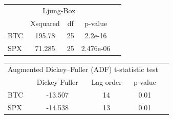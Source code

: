 \documentclass{beamer}
\begin{document}
\begin{frame}
	\begin{center}
		\begin{tabular}{l|*{3}{c}r}
		\multicolumn{4}{c}{Ljung-Box}\\
				& Xsquared & df & p-value \\
		\hline
			BTC & 195.78 & 25 & 2.2e-16 \\  
			SPX & 71.285 & 25 & 2.476e-06  
		\end{tabular}

		\bigskip
		\bigskip
		\begin{tabular}{l|*{3}{c}r}
			\multicolumn{4}{c}{Augmented Dickey–Fuller (ADF) t-statistic test}\\
				& Dickey-Fuller & Lag order & p-value \\
			\hline
			BTC & -13.507 & 14 & 0.01 \\  
			SPX & -14.538 & 13 & 0.01  
		\end{tabular}
	\end{center}
\end{frame}
\end{document}

